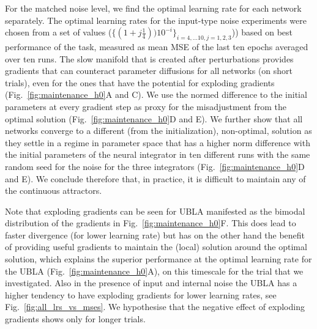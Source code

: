 \documentclass{article} %
\newcounter{ct}
\theoremstyle{definition}
\theoremstyle{remark}
\begin{document}
For the matched noise level, we find the optimal learning rate for each network separately.
The optimal learning rates for the input-type noise experiments were chosen from a set of values 
($\{(1+j\frac{1}{4}))10^{-i}\}_{i=4,\dots 10, j=1,2,3}$))  based on best performance of the task, measured as mean MSE of the last ten epochs averaged over ten runs.
The slow manifold that is created after perturbations provides gradients that can counteract parameter diffusions for all networks (on short trials), even for the ones that have the potential for exploding gradients (Fig.~\ref{fig:maintenance_h0}A and C).
We use the normed difference to the initial parameters at every gradient step as proxy for the misadjustment from the optimal solution (Fig.~\ref{fig:maintenance_h0}D and E).
 We further show that all networks converge to a different (from the initialization), non-optimal, solution as they settle in a regime in parameter space that has a higher norm difference with the initial parameters of the neural integrator in ten different runs with the same random seed for the noise for the three integrators (Fig.~\ref{fig:maintenance_h0}D and E).
 We conclude therefore that, in practice, it is difficult to maintain any of the continuous attractors.

Note that exploding gradients can be seen for UBLA manifested as the bimodal distribution of the gradients in Fig.~\ref{fig:maintenance_h0}F. This does lead to faster divergence (for lower learning rate) but has on the other hand the benefit of providing useful gradients to maintain the (local) solution around the optimal solution, which explains the superior performance at the optimal learning rate for the UBLA (Fig.~\ref{fig:maintenance_h0}A), on this timescale for the trial that we investigated.
Also in the presence of input and internal noise the UBLA has a higher tendency to have exploding gradients for lower learning rates, see Fig.~\ref{fig:all_lrs_vs_mses}. 
We hypothesise that the negative effect of exploding gradients shows only for longer trials.
\end{document}
